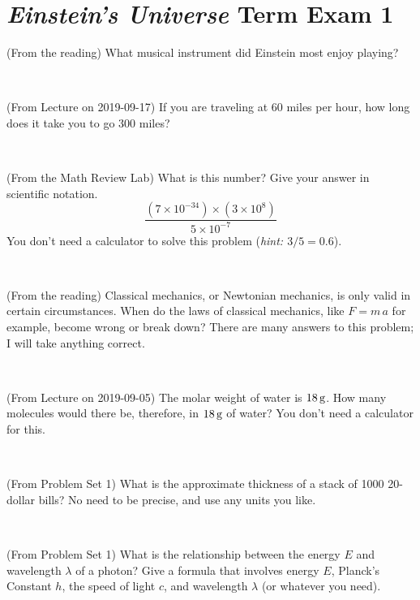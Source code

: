 \documentclass[12pt, letterpaper]{article}
\begin{document}
\section*{\textsl{Einstein's Universe} Term Exam 1}
\setcounter{problem}{1}


\begin{problem} (From the reading)
What musical instrument did Einstein most enjoy playing?
\end{problem}


\vfill ~

\begin{problem} (From Lecture on 2019-09-17)
If you are traveling at 60 miles per hour, how long does
it take you to go 300 miles?
\end{problem}


\vfill ~

\begin{problem} (From the Math Review Lab)
What is this number? Give your answer in scientific notation.
$$
\frac{(7\times10^{-34})\times(3\times10^8)}{5\times10^{-7}}
$$
You don't need a calculator to solve this problem (\textit{hint: $3/5=0.6$}).
\end{problem}


\vfill ~

\begin{problem} (From the reading)
Classical mechanics, or Newtonian mechanics, is only valid in certain
circumstances. When do the laws of classical mechanics, like $F =
m\,a$ for example, become wrong or break down? There are many answers
to this problem; I will take anything correct.
\end{problem}


\vfill ~


\clearpage


\begin{problem} (From Lecture on 2019-09-05)
The molar weight of water is $18\,\mathrm{g}$. How many molecules would there
be, therefore, in $18\,\mathrm{g}$ of water? You don't need a calculator for
this.
\end{problem}


\vfill ~

\begin{problem} (From Problem Set 1)
What is the approximate thickness of a stack of 1000 20-dollar bills?
No need to be precise, and use any units you like.
\end{problem}


\vfill ~

\begin{problem} (From Problem Set 1)
What is the relationship between the energy $E$ and wavelength
$\lambda$ of a photon? Give a formula that involves energy $E$,
Planck's Constant $h$, the speed of light $c$, and wavelength
$\lambda$ (or whatever you need).
\end{problem}
\end{document}
